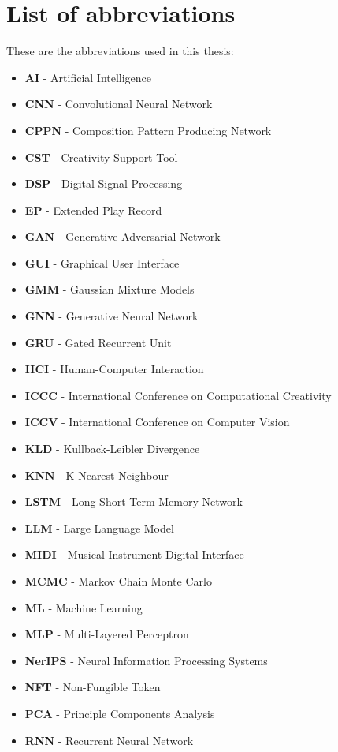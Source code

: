 \chapter*{List of abbreviations}

These are the abbreviations used in this thesis: 
\begin{itemize}
\item \textbf{AI} - Artificial Intelligence
\item \textbf{CNN} - Convolutional Neural Network
\item \textbf{CPPN} - Composition Pattern Producing Network
\item \textbf{CST} - Creativity Support Tool
\item \textbf{DSP} - Digital Signal Processing
\item \textbf{EP} - Extended Play Record
\item \textbf{GAN} - Generative Adversarial Network
\item \textbf{GUI} - Graphical User Interface
\item \textbf{GMM} - Gaussian Mixture Models
\item \textbf{GNN} - Generative Neural Network
\item \textbf{GRU} - Gated Recurrent Unit
\item \textbf{HCI} - Human-Computer Interaction
\item \textbf{ICCC} - International Conference on Computational Creativity
\item \textbf{ICCV} - International Conference on Computer Vision
\item \textbf{KLD} - Kullback-Leibler Divergence
\item \textbf{KNN} - K-Nearest Neighbour
\item \textbf{LSTM} - Long-Short Term Memory Network
\item \textbf{LLM} - Large Language Model
\item \textbf{MIDI} - Musical Instrument Digital Interface
\item \textbf{MCMC} - Markov Chain Monte Carlo
\item \textbf{ML} - Machine Learning
\item \textbf{MLP} - Multi-Layered Perceptron
\item \textbf{NerIPS} - Neural Information Processing Systems
\item \textbf{NFT} - Non-Fungible Token
\item \textbf{PCA} - Principle Components Analysis
\item \textbf{RNN} - Recurrent Neural Network

\end{itemize}
